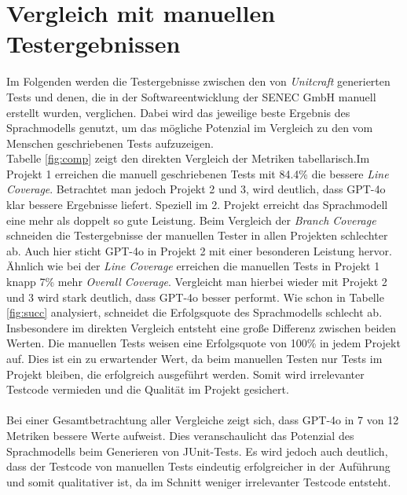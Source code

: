 \section{Vergleich mit manuellen Testergebnissen}
Im Folgenden werden die Testergebnisse zwischen den von \textit{Unitcraft} generierten Tests und denen, die in der Softwareentwicklung der SENEC GmbH manuell erstellt wurden, verglichen. Dabei wird das jeweilige beste Ergebnis des Sprachmodells genutzt, um das mögliche Potenzial im Vergleich zu den vom Menschen geschriebenen Tests aufzuzeigen.\\
Tabelle \ref{fig:comp} zeigt den direkten Vergleich der Metriken tabellarisch.Im Projekt 1 erreichen die manuell geschriebenen Tests mit 84.4\% die bessere \textit{Line Coverage}. Betrachtet man jedoch Projekt 2 und 3, wird deutlich, dass GPT-4o klar bessere Ergebnisse liefert. Speziell im 2. Projekt erreicht das Sprachmodell eine mehr als doppelt so gute Leistung. Beim Vergleich der \textit{Branch Coverage} schneiden die Testergebnisse der manuellen Tester in allen Projekten schlechter ab. Auch hier sticht GPT-4o in Projekt 2 mit einer besonderen Leistung hervor. Ähnlich wie bei der \textit{Line Coverage} erreichen die manuellen Tests in Projekt 1 knapp 7\% mehr \textit{Overall Coverage}. Vergleicht man hierbei wieder mit Projekt 2 und 3 wird stark deutlich, dass GPT-4o besser performt. Wie schon in Tabelle \ref{fig:succ} analysiert, schneidet die Erfolgsquote des Sprachmodells schlecht ab. Insbesondere im direkten Vergleich entsteht eine große Differenz zwischen beiden Werten. Die manuellen Tests weisen eine Erfolgsquote von 100\% in jedem Projekt auf. Dies ist ein zu erwartender Wert, da beim manuellen Testen nur Tests im Projekt bleiben, die erfolgreich ausgeführt werden. Somit wird irrelevanter Testcode vermieden und die Qualität im Projekt gesichert.\\\\
Bei einer Gesamtbetrachtung aller Vergleiche zeigt sich, dass GPT-4o in 7 von 12 Metriken bessere Werte aufweist. Dies veranschaulicht das Potenzial des Sprachmodells beim Generieren von JUnit-Tests. Es wird jedoch auch deutlich, dass der Testcode von manuellen Tests eindeutig erfolgreicher in der Auführung und somit qualitativer ist, da im Schnitt weniger irrelevanter Testcode entsteht.

